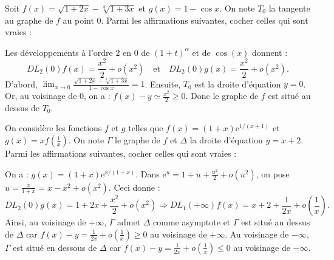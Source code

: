 \begin{question}
Soit $\displaystyle f(x)=\sqrt{1+2x}-\sqrt[3]{1+3x}$ et $g(x)=1-\cos x$. On note $T_0$ la tangente au graphe de $f$ au point $0$. Parmi les affirmations suivantes, cocher celles qui sont vraies :
\begin{answers}  
\end{answers}
\vskip2mm
\begin{explanations}
Les développements à l'ordre $2$ en $0$ de $(1+t)^{\alpha}$ et de $\cos (x)$ donnent :
$$\displaystyle DL_2(0)f(x)=\frac{x^2}{2}+o(x^2)\quad \mbox{et}\quad DL_2(0)g(x)=\frac{x^2}{2}+o(x^2).$$
D'abord, $\displaystyle \lim _{x\to 0}\frac{\sqrt{1+2x}-\sqrt[3]{1+3x}}{1-\cos x}=1$. Ensuite, $T_0$ est la droite d'équation $y=0$. Or, au voisinage de $0$, on a : $\displaystyle f(x)-y\simeq \frac{x^2}{2}\geq 0$. Donc le graphe de $f$ est situé au dessus de $T_0$.
\end{explanations}
\end{question}

\begin{question}
On considère les fonctions $f$ et $g$ telles que $\displaystyle f(x)=(1+x)\mathrm{e}^{1/(x+1)}$ et $\displaystyle g(x)=xf\left(\frac{1}{x}\right)$. On note $\Gamma$ le graphe de $f$ et $\Delta$ la droite d'équation $\displaystyle y=x+2$. Parmi les affirmations suivantes, cocher celles qui sont vraies :
\begin{answers}  
\end{answers}
\vskip2mm
\begin{explanations}
On a : $\displaystyle g(x)=(1+x)\mathrm{e}^{x/(1+x)}$. Dans $\displaystyle \mathrm{e}^u=1+u+\frac{u^2}{2}+o(u^2)$, on pose $\displaystyle u=\frac{x}{1+x}=x-x^2+o(x^2)$. Ceci donne :
$$DL_2(0)g(x)=1+2x+\frac{x^2}{2}+o(x^2)\Rightarrow DL_1(+\infty)f(x)=x+2+\frac{1}{2x}+o\left(\frac{1}{x}\right).$$
Ainsi, au voisinage de $+\infty$, $\Gamma$ admet $\Delta$ comme asymptote et $\Gamma$ est situé au dessus de $\Delta$ car $\displaystyle f(x)-y=\frac{1}{2x}+o\left(\frac{1}{x}\right)\geq 0$ au voisinage de $+\infty$. Au voisinage de $-\infty$, $\Gamma$ est situé en dessous de $\Delta$ car $\displaystyle f(x)-y=\frac{1}{2x}+o\left(\frac{1}{x}\right)\leq 0$ au voisinage de $-\infty$.
\end{explanations}
\end{question}


